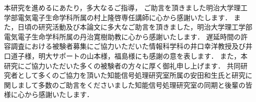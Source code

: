 \begin{acknowledgement}
本研究を進めるにあたり，多大なるご指導，
ご助言を頂きました明治大学理工学部電気電子生命学科所属の村上隆啓専任講師に心から感謝いたします．
また，日頃の研究活動及び本論文に多大なご助言を頂きました，明治大学理工学部電気電子生命学科所属の丹治寛樹助教に心から感謝いたします．
遅延時間の許容調査における被験者募集にご協力いただいた情報科学科の井口幸洋教授及び井口道子様，明大サポートの山本様，福島様にも感謝の意を表します．
また，本研究にご協力いただいた多くの被験者の方々に厚く御礼申し上げます．
共同研究者として多くのご協力を頂いた知能信号処理研究室所属の安田和生氏と研究に関しまして多数のご助言をくださいました知能信号処理研究室の同期と後輩の皆様に心から感謝いたします．
\makesignature
\end{acknowledgement}
